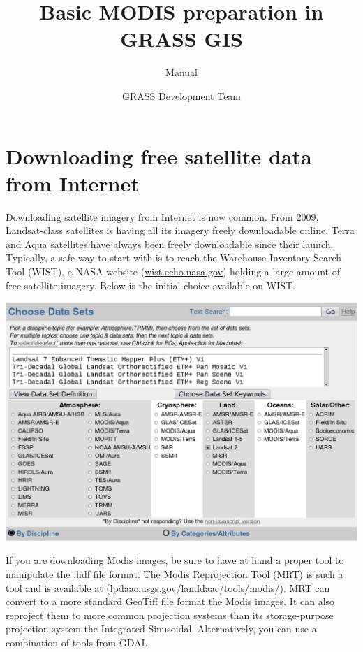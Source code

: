 %


\title{Basic MODIS preparation in GRASS GIS}
\subtitle{Manual}
\author{GRASS Development Team}

\maketitle
\section{Downloading free satellite data from Internet}
Downloading satellite imagery from Internet is now common. From 2009, Landsat-class satellites is having all its imagery freely downloadable online. Terra and Aqua satellites have always been freely downloadable since their launch. Typically, a safe way to start with is to reach the Warehouse Inventory Search Tool (WIST), a NASA website (\href{http://wist.echo.nasa.gov}{wist.echo.nasa.gov}) holding a large amount of free satellite imagery. Below is the initial choice available on WIST.
\begin{center}
 \includegraphics[scale=0.17]{WIST_datasets.png}
\end{center}
If you are downloading Modis images, be sure to have at hand a proper tool to manipulate the .hdf file format. The Modis Reprojection Tool (MRT) is such a tool and is available at (\href{http://lpdaac.usgs.gov/landdaac/tools/modis/index.asp}{lpdaac.usgs.gov/landdaac/tools/modis/}). MRT can convert to a more standard GeoTiff file format the Modis images. It can also reproject them to more common projection systems than its storage-purpose projection system the Integrated Sinusoidal. Alternatively, you can use a combination of tools from GDAL.\newline\linebreak
